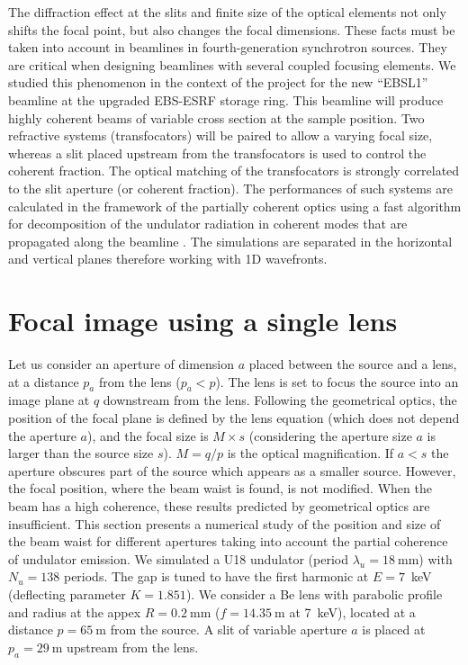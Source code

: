 \documentclass[9pt,twocolumn,twoside]{osajnl}
\begin{document}
The diffraction effect at the slits and finite size of the optical elements not only shifts the focal point, but also changes the focal dimensions. These facts must be taken into account in beamlines in fourth-generation synchrotron sources. They are critical when designing beamlines with several coupled focusing elements. We studied this phenomenon in the context of the project for the new ``EBSL1'' beamline at the upgraded EBS-ESRF storage ring. This beamline will produce highly coherent beams of variable cross section at the sample position. Two refractive systems (transfocators) will be paired to allow a varying focal size, whereas a slit placed upstream from the transfocators is used to control the coherent fraction. The optical matching of the transfocators is strongly correlated to the slit aperture (or coherent fraction). The performances of such systems are calculated in the framework of the partially coherent optics using a fast algorithm for decomposition of the undulator radiation in coherent modes that are propagated along the beamline \cite{delrio2021pairing}. The simulations are separated in the horizontal and vertical planes therefore working with 1D wavefronts.

\section{Focal image using a single lens}
\label{sec:onelens}

Let us consider an aperture of dimension $a$ placed between the source and a lens, at a distance $p_a$ from the lens ($p_a < p$). The lens is set to focus the source into an image plane at $q$ downstream from the lens. Following the geometrical optics, the position of the focal plane is defined by the lens equation (which does not depend the aperture $a$), and the focal size is $M \times s$  (considering the aperture size $a$ is larger than the source size $s$). $M = q/p$ is the optical magnification. If $a<s$ the aperture obscures part of the source which appears as a smaller source. However, the focal position, where the beam waist is found, is not modified. When the beam has a high coherence, these results predicted by geometrical optics are insufficient. This section presents a numerical study of the position and size of the beam waist for different apertures taking into account the partial coherence of undulator emission. We simulated a U18 undulator (period $\lambda_u=\SI{18}{\milli\meter}$) with $N_u=138$ periods. The gap is tuned to have the first harmonic at $E=7$~keV (deflecting parameter $K=1.851$). We consider a Be lens with parabolic profile and radius at the appex $R=\SI{0.2}{\milli\meter}$ ($f=\SI{14.35}{\meter}$ at 7~keV), located at a distance $p=\SI{65}{\meter}$ from the source. A slit of variable aperture $a$ is placed at $p_a=\SI{29}{\meter}$ upstream from the lens. 
\end{document}
